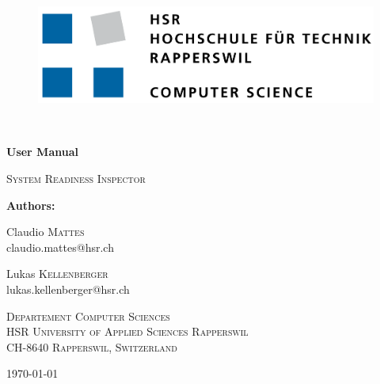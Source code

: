 \begin{titlepage}
	\centering
	\begin{figure}
		\centering
		\includegraphics[width=0.7\linewidth]{./assets/logo/hsr.png}  	
	\end{figure}
	\
	\vfill
	{\huge\bfseries User Manual\par}
	\vspace{5mm}
	{\scshape\Large System Readiness Inspector\par}
	\vfill

	{\Large\textbf{Authors:} \\\vspace{0.2cm}}
	{\Large Claudio \textsc{Mattes} \\\small claudio.mattes@hsr.ch \par\vspace{0.2cm}
	\Large Lukas \textsc{Kellenberger} \\\small lukas.kellenberger@hsr.ch}


	\vfill
	{\scshape\scriptsize Departement Computer Sciences \\ HSR University of Applied Sciences Rapperswil \\ CH-8640 Rapperswil, Switzerland \par}
	\vfill

    {\large \today}
\end{titlepage}
